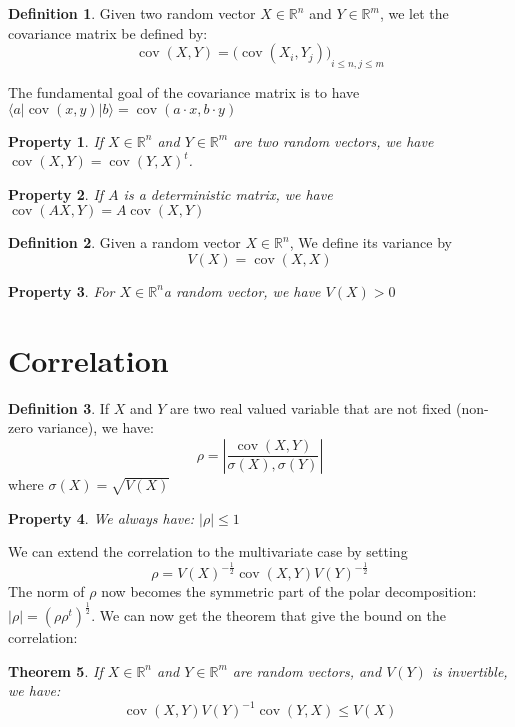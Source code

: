 \documentclass[10pt]{report}
\theoremstyle{plain}
\newtheorem{thm}{Theorem}[chapter]
\newtheorem{prop}[thm]{Property}
\theoremstyle{definition}
\newtheorem{defn}{Definition}[chapter]
\theoremstyle{remark}
\newcommand{\R}{\ensuremath{\mathbb{R}}}
\newcommand{\ket}[1]{|#1\rangle}
\newcommand{\bra}[1]{\langle#1|}
\renewcommand{\leq}{\leqslant}
\DeclareMathOperator{\cov}{cov}
\begin{document}
\begin{defn}
  Given two random vector $X \in \R^n$ and $Y \in \R^m$, we let the covariance
  matrix be defined by:
  \[\cov(X,Y) = {\big(\cov(X_i,Y_j)\big)}_{i \leq n, j \leq m}\]
\end{defn}

The fundamental goal of the covariance matrix is to have $\bra a \cov(x,y) \ket
b = \cov(a \cdot x, b \cdot y)$
\begin{prop} If $X \in \R^n$ and $Y \in \R^m$ are two random vectors, we have $\cov(X,Y) = {\cov(Y,X)}^t$.
\end{prop}
\begin{prop} If $A$ is a deterministic matrix, we have $ \cov(A X, Y) = A \cov(X,Y)$
\end{prop}

\begin{defn}
  Given a random vector $X \in \R^n$, We define its variance by
  \[V(X) = \cov(X,X)\]
\end{defn}

\begin{prop} For $X \in \R^n$a random vector, we have $V(X) > 0$
\end{prop}

\section{Correlation}\label{sec:correl}

\begin{defn}
  If $X$ and $Y$ are two real valued variable that are not fixed (non-zero
  variance), we have:
  \[\rho = \left|\frac {\cov(X,Y)}{\sigma(X),\sigma(Y)}\right|\]
  where $\sigma(X) = \sqrt{V(X)}$
\end{defn}

\begin{prop}\label{prop:correl1}
  We always have: $|\rho| \le 1$
\end{prop}

We can extend the correlation to the multivariate case by setting
\[\rho = {V(X)}^{-\frac12}\cov(X,Y){V(Y)}^{-\frac12}\]
The norm of $\rho$ now becomes the symmetric part of the polar decomposition:  $|\rho|
= {(\rho\rho^t)}^{\frac12}$. We can now get the theorem that give the bound on the
correlation:

\begin{thm}\label{thm:correln}
  If $X \in \R^n$ and $Y \in \R^m$ are random vectors, and $V(Y)$ is invertible,
  we have:
  \[\cov(X,Y){V(Y)}^{-1}\cov(Y,X) \leq V(X)\]
\end{thm}
\end{document}
